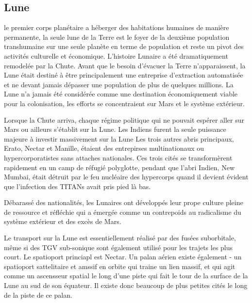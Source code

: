                                                          \subsection{Lune} \label{sec:luna} 

                                                         le premier corps planétaire a héberger des habitations humaines de manière permanente, la seule lune de la Terre est le foyer de la deuxième population transhumaine sur une seule planète en terme de population et reste un pivot des activités culturelle et économique. L'histoire Lunaire a été dramatiquement remodelée par la Chute. Avant que le besoin d'évacuer la Terre n'apparaissent, la Lune était destiné à être principalement une entreprise d'extraction automatisée et ne devant jamais dépasser une population de plus de quelques millions. La Lune n'a jamais été considérée comme une destination économiquement viable pour la colonisation, les efforts se concentraient sur Mars et le système extérieur. 

                                                         Lorsque la Chute arriva, chaque régime politique qui ne pouvait espérer aller sur Mars ou ailleurs s'établit sur la Lune. Les Indiens furent la seule puissance majeure à investir massivement sur la Lune Les trois autres abris principaux, Erato, Nectar et Manille, étaient des entrepirses multinationaux ou hypercorporatistes sans attaches nationales. Ces trois cités se transformèrent rapidement en un camp de réfugié polyglotte, pendant que l'abri Indien, New Mumbai, était détruit par le feu nucléaire des hypercorps quand il devient évident que l'infection des TITANs avait pris pied là bas. 

                                                         Débarassé des nationalités, les Lunaires ont développés leur prope culture pleine de ressource et réfléchie qui a émergée comme un contrepoids au radicalisme du système extérieur et des excès de Mars. 

                                                         Le transport sur la Lune est essentiellement réalisé par des fusées suborbitale, même si des TGV sub-sonique sont également utilisé pour les trajets les plus court. Le spatioport princiapl est Nectar. Un palan aérien existe également - un spatioport sattelitaire et amssif en orbite qui traine un lien massif, et qui agit comme un ascensseur spatial le long d'une piste qui fait le tour de la surface de la Lune au sud de son équateur. Il existe donc beaucoup de plus petites cités le long de la piste de ce palan. 

